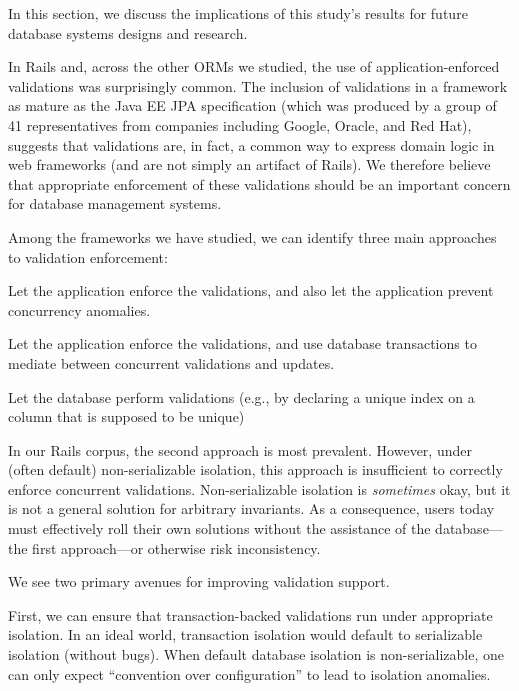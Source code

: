 In this section, we discuss the implications of this study's results
for future database systems designs and research.

In Rails and, across the other ORMs we studied, the use of
application-enforced validations was surprisingly common. The
inclusion of validations in a framework as mature as the Java EE JPA
specification (which was produced by a group of 41 representatives
from companies including Google, Oracle, and Red Hat), suggests that
validations are, in fact, a common way to express domain logic in web
frameworks (and are not simply an artifact of Rails). We therefore
believe that appropriate enforcement of these validations should
be an important concern for database management systems.

 Among the frameworks we have studied,
we can identify three main approaches to validation enforcement:
\begin{defendenumerate}
\item Let the application enforce the validations, and also let
  the application prevent concurrency anomalies.

\item Let the application enforce the validations, and use database
  transactions to mediate between concurrent validations and updates.

\item Let the database perform validations (e.g., by declaring a unique
  index on a column that is supposed to be unique)
\end{defendenumerate}
In our Rails corpus, the second approach is most prevalent. However,
under (often default) non-serializable isolation, this approach is
insufficient to correctly enforce concurrent
validations. Non-serializable isolation is \textit{sometimes} okay,
but it is not a general solution for arbitrary invariants. As a
consequence, users today must effectively roll their own solutions
without the assistance of the database---the first approach---or
otherwise risk inconsistency.

We see two primary avenues for improving validation support.

 First, we can ensure that
transaction-backed validations run under appropriate isolation. In an
ideal world, transaction isolation would default to serializable
isolation (without bugs). When default database isolation is
non-serializable, one can only expect ``convention over
configuration'' to lead to isolation anomalies.

